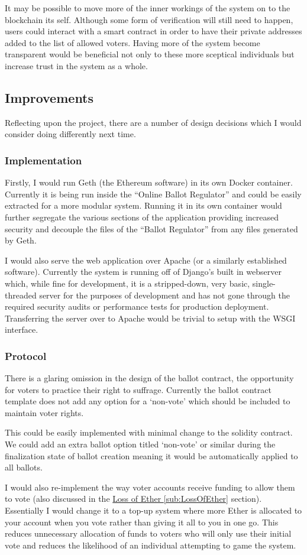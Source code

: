 \documentclass{article}
\begin{document}
	It may be possible to move more of the inner workings of the system on to the blockchain its self. Although some form of verification will still need to happen, users could interact with a smart contract in order to have their private addresses added to the list of allowed voters. Having more of the system become transparent would be beneficial not only to these more sceptical individuals but increase trust in the system as a whole.
    
\clearpage
\subsection{Improvements}
Reflecting upon the project, there are a number of design decisions which I would consider doing differently next time.

\subsubsection{Implementation}
Firstly, I would run Geth (the Ethereum software) in its own Docker container. Currently it is being run inside the ``Online Ballot Regulator'' and could be easily extracted for a more modular system. Running it in its own container would further segregate the various sections of the application providing increased security and decouple the files of the ``Ballot Regulator'' from any files generated by Geth.

I would also serve the web application over Apache (or a similarly established software). Currently the system is running off of Django's built in webserver which, while fine for development, it is a stripped-down, very basic, single-threaded server for the purposes of development and has not gone through the required security audits or performance tests for production deployment. Transferring the server over to Apache would be trivial to setup with the WSGI interface.

\subsubsection{Protocol}
There is a glaring omission in the design of the ballot contract, the opportunity for voters to practice their right to suffrage. Currently the ballot contract template does not add any option for a `non-vote' which should be included to maintain voter rights.

This could be easily implemented with minimal change to the solidity contract. We could add an extra ballot option titled `non-vote' or similar during the finalization state of ballot creation meaning it would be automatically applied to all ballots.

I would also re-implement the way voter accounts receive funding to allow them to vote (also discussed in the \hyperref[sub:LossOfEther]{Loss of Ether \ref*{sub:LossOfEther}} section). Essentially I would change it to a top-up system where more Ether is allocated to your account when you vote rather than giving it all to you in one go. This reduces unnecessary allocation of funds to voters who will only use their initial vote and reduces the likelihood of an individual attempting to game the system.
\end{document}
